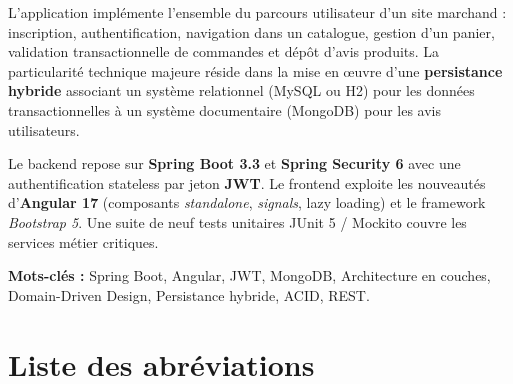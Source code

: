 \documentclass[11pt,a4paper,oneside]{report}
\begin{document}
L'application implémente l'ensemble du parcours utilisateur d'un site
marchand : inscription, authentification, navigation dans un catalogue,
gestion d'un panier, validation transactionnelle de commandes et dépôt
d'avis produits. La particularité technique majeure réside dans la mise en
\oe uvre d'une \textbf{persistance hybride} associant un système relationnel
(MySQL ou H2) pour les données transactionnelles à un système documentaire
(MongoDB) pour les avis utilisateurs.

Le backend repose sur \textbf{Spring Boot 3.3} et \textbf{Spring Security 6}
avec une authentification stateless par jeton \textbf{JWT}. Le frontend
exploite les nouveautés d'\textbf{Angular 17} (composants \textit{standalone},
\textit{signals}, lazy loading) et le framework \textit{Bootstrap 5}. Une
suite de neuf tests unitaires JUnit 5 / Mockito couvre les services métier
critiques.

\textbf{Mots-clés :} Spring Boot, Angular, JWT, MongoDB, Architecture en
couches, Domain-Driven Design, Persistance hybride, ACID, REST.

\tableofcontents
\listoffigures
\listoftables

\chapter*{Liste des abréviations}
\end{document}

